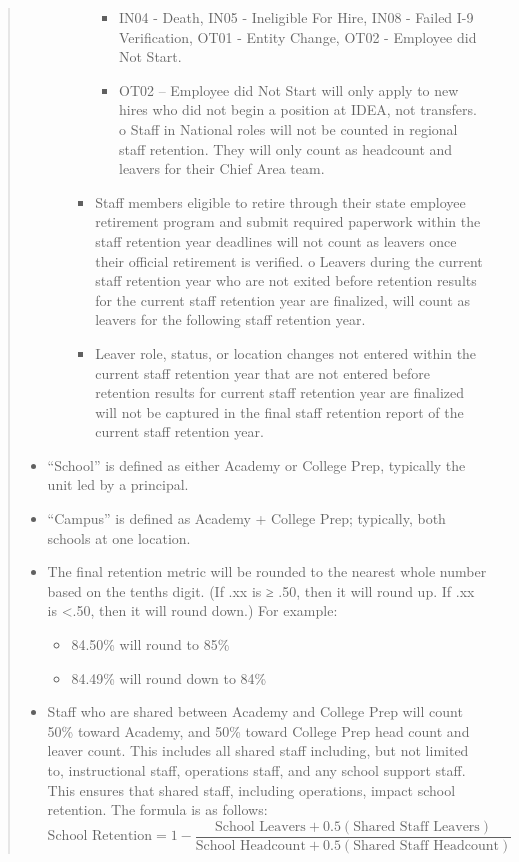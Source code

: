 \documentclass[
  letterpaper,
  DIV=11,
  numbers=noendperiod]{scrreprt}
\providecommand{\tightlist}{%
  \setlength{\itemsep}{0pt}\setlength{\parskip}{0pt}}
\begin{document}
\begin{quote}
\begin{itemize}
\begin{itemize}
\begin{itemize}
      \begin{itemize}
      \tightlist
      \item
        IN04 - Death, IN05 - Ineligible For Hire, IN08 - Failed I-9
        Verification, OT01 - Entity Change, OT02 - Employee did Not
        Start.
      \item
        OT02 -- Employee did Not Start will only apply to new hires who
        did not begin a position at IDEA, not transfers. o Staff in
        National roles will not be counted in regional staff retention.
        They will only count as headcount and leavers for their Chief
        Area team.
      \end{itemize}
    \item
      Staff members eligible to retire through their state employee
      retirement program and submit required paperwork within the staff
      retention year deadlines will not count as leavers once their
      official retirement is verified. o Leavers during the current
      staff retention year who are not exited before retention results
      for the current staff retention year are finalized, will count as
      leavers for the following staff retention year.
    \item
      Leaver role, status, or location changes not entered within the
      current staff retention year that are not entered before retention
      results for current staff retention year are finalized will not be
      captured in the final staff retention report of the current staff
      retention year.
    \end{itemize}
  \end{itemize}
\item
  ``School'' is defined as either Academy or College Prep, typically the
  unit led by a principal.
\item
  ``Campus'' is defined as Academy + College Prep; typically, both
  schools at one location.
\item
  The final retention metric will be rounded to the nearest whole number
  based on the tenths digit. (If .xx is ≥ .50, then it will round up. If
  .xx is \textless.50, then it will round down.) For example:

  \begin{itemize}
  \tightlist
  \item
    84.50\% will round to 85\%
  \item
    84.49\% will round down to 84\%
  \end{itemize}
\item
  Staff who are shared between Academy and College Prep will count 50\%
  toward Academy, and 50\% toward College Prep head count and leaver
  count. This includes all shared staff including, but not limited to,
  instructional staff, operations staff, and any school support staff.
  This ensures that shared staff, including operations, impact school
  retention. The formula is as follows:
  \[\text{School Retention} = 1-\frac{\text{School Leavers} + 0.5(\text{Shared Staff Leavers})}{\text{School Headcount} + 0.5(\text{Shared Staff Headcount})} \]
\end{itemize}


\end{quote}
\end{document}
